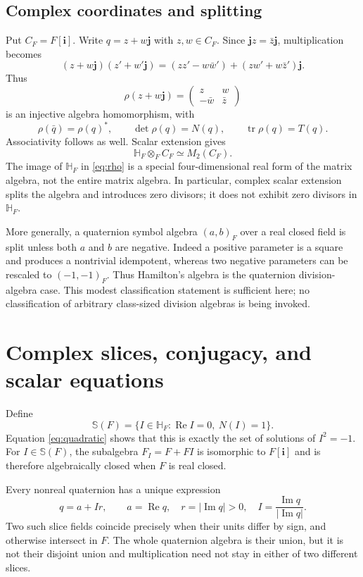 \documentclass[11pt,letterpaper]{article}
\numberwithin{equation}{section}
\theoremstyle{definition}
\theoremstyle{remark}
\newcommand{\HF}{\mathbb H_F}
\newcommand{\ii}{\mathbf i}
\newcommand{\jj}{\mathbf j}
\newcommand{\Rea}{\operatorname{Re}}
\newcommand{\Ima}{\operatorname{Im}}
\newcommand{\tr}{\operatorname{tr}}
\begin{document}
\subsection{Complex coordinates and splitting}
Put $C_F=F[\ii]$. Write $q=z+w\jj$ with $z,w\in C_F$. Since
$\jj z=\bar z\jj$, multiplication becomes
\[
 (z+w\jj)(z'+w'\jj)
 =(zz'-w\bar w')+(zw'+w\bar z')\jj.
\]
Thus
\begin{equation}\label{eq:rho}
 \rho(z+w\jj)=
 \begin{pmatrix}z&w\\-\bar w&\bar z\end{pmatrix}
\end{equation}
is an injective algebra homomorphism, with
\[
 \rho(\bar q)=\rho(q)^*,\qquad
 \det\rho(q)=N(q),\qquad \tr\rho(q)=T(q).
\]
Associativity follows as well. Scalar extension gives
\[
 \HF\otimes_F C_F\simeq M_2(C_F).
\]
The image of $\HF$ in \eqref{eq:rho} is a special four-dimensional real form of the matrix
algebra, not the entire matrix algebra. In particular, complex scalar extension splits the
algebra and introduces zero divisors; it does not exhibit zero divisors in $\HF$.

More generally, a quaternion symbol algebra $(a,b)_F$ over a real closed field is split unless
both $a$ and $b$ are negative. Indeed a positive parameter is a square and produces a
nontrivial idempotent, whereas two negative parameters can be rescaled to $(-1,-1)_F$.
Thus Hamilton's algebra is the quaternion division-algebra case. This modest classification
statement is sufficient here; no classification of arbitrary class-sized division algebras is
being invoked.

\section{Complex slices, conjugacy, and scalar equations}\label{sec:slices}

Define
\[
 \mathbb S(F)=\{I\in\HF:\Rea I=0,\ N(I)=1\}.
\]
Equation \eqref{eq:quadratic} shows that this is exactly the set of solutions of $I^2=-1$.
For $I\in\mathbb S(F)$, the subalgebra $F_I=F+FI$ is isomorphic to $F[\ii]$ and is therefore
algebraically closed when $F$ is real closed.

Every nonreal quaternion has a unique expression
\begin{equation}\label{eq:slice-decomp}
 q=a+Ir,\qquad a=\Rea q,\quad r=|\Ima q|>0,\quad
 I=\frac{\Ima q}{|\Ima q|}.
\end{equation}
Two such slice fields coincide precisely when their units differ by sign, and otherwise
intersect in $F$. The whole quaternion algebra is their union, but it is not their disjoint
union and multiplication need not stay in either of two different slices.
\end{document}

